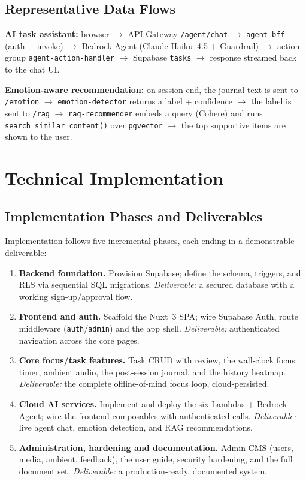 \documentclass[a4paper,11pt]{article}
\begin{document}
	\subsection{Representative Data Flows}
	\textbf{AI task assistant:} browser \(\rightarrow\) API Gateway \texttt{/agent/chat}
	\(\rightarrow\) \texttt{agent-bff} (auth + invoke) \(\rightarrow\) Bedrock Agent
	(Claude Haiku~4.5 + Guardrail) \(\rightarrow\) action group \texttt{agent-action-handler}
	\(\rightarrow\) Supabase \texttt{tasks} \(\rightarrow\) response streamed back to the chat UI.

	\smallskip
	\noindent\textbf{Emotion-aware recommendation:} on session end, the journal text is sent to
	\texttt{/emotion} \(\rightarrow\) \texttt{emotion-detector} returns a label + confidence
	\(\rightarrow\) the label is sent to \texttt{/rag} \(\rightarrow\) \texttt{rag-recommender}
	embeds a query (Cohere) and runs \texttt{search\_similar\_content()} over \texttt{pgvector}
	\(\rightarrow\) the top supportive items are shown to the user.

	\section{Technical Implementation}

	\subsection{Implementation Phases and Deliverables}
	Implementation follows five incremental phases, each ending in a demonstrable deliverable:
	\begin{enumerate}
		\item \textbf{Backend foundation.} Provision Supabase; define the schema, triggers, and
		      RLS via sequential SQL migrations. \emph{Deliverable:} a secured database with a
		      working sign-up/approval flow.
		\item \textbf{Frontend and auth.} Scaffold the Nuxt~3 SPA; wire Supabase Auth,
		      route middleware (\texttt{auth}/\texttt{admin}) and the app shell.
		      \emph{Deliverable:} authenticated navigation across the core pages.
		\item \textbf{Core focus/task features.} Task CRUD with review, the wall-clock focus
		      timer, ambient audio, the post-session journal, and the history heatmap.
		      \emph{Deliverable:} the complete offline-of-mind focus loop, cloud-persisted.
		\item \textbf{Cloud AI services.} Implement and deploy the six Lambdas + Bedrock Agent;
		      wire the frontend composables with authenticated calls. \emph{Deliverable:} live
		      agent chat, emotion detection, and RAG recommendations.
		\item \textbf{Administration, hardening and documentation.} Admin CMS (users, media,
		      ambient, feedback), the user guide, security hardening, and the full document set.
		      \emph{Deliverable:} a production-ready, documented system.
	\end{enumerate}
\end{document}
